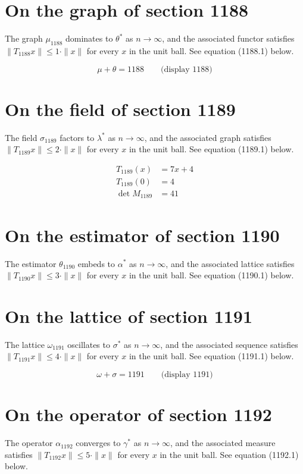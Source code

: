 \documentclass{article}
\begin{document}
\section{On the graph of section 1188}
The graph $\mu_{1188}$ dominates to $\theta^{*}$ as $n \to \infty$,
and the associated functor satisfies $\|T_{1188} x\| \leq 1 \cdot \|x\|$
for every $x$ in the unit ball. See equation (1188.1) below.

$$
\mu + \theta = 1188 \qquad \text{(display 1188)}
$$

\section{On the field of section 1189}
The field $\sigma_{1189}$ factors to $\lambda^{*}$ as $n \to \infty$,
and the associated graph satisfies $\|T_{1189} x\| \leq 2 \cdot \|x\|$
for every $x$ in the unit ball. See equation (1189.1) below.

\begin{align}
T_{1189}(x) &= 7 x + 4 \\
T_{1189}(0) &= 4 \\
\det M_{1189} &= 41
\end{align}

\section{On the estimator of section 1190}
The estimator $\theta_{1190}$ embeds to $\alpha^{*}$ as $n \to \infty$,
and the associated lattice satisfies $\|T_{1190} x\| \leq 3 \cdot \|x\|$
for every $x$ in the unit ball. See equation (1190.1) below.

\section{On the lattice of section 1191}
The lattice $\omega_{1191}$ oscillates to $\sigma^{*}$ as $n \to \infty$,
and the associated sequence satisfies $\|T_{1191} x\| \leq 4 \cdot \|x\|$
for every $x$ in the unit ball. See equation (1191.1) below.

$$
\omega + \sigma = 1191 \qquad \text{(display 1191)}
$$

\section{On the operator of section 1192}
The operator $\alpha_{1192}$ converges to $\gamma^{*}$ as $n \to \infty$,
and the associated measure satisfies $\|T_{1192} x\| \leq 5 \cdot \|x\|$
for every $x$ in the unit ball. See equation (1192.1) below.
\end{document}

